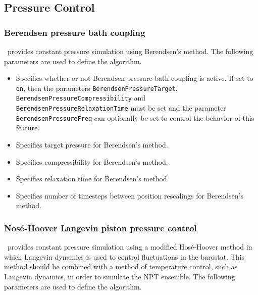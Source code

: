 \subsection{Pressure Control}

\subsubsection{Berendsen pressure bath coupling}

\NAMD\ provides constant pressure simulation using Berendsen's method.  
The following parameters are used to define the algorithm.  

\begin{itemize}

\item
{}
{Specifies whether or not Berendsen pressure bath coupling is active.  
If set to \verb!on!, then the parameters \verb!BerendsenPressureTarget!, \verb!BerendsenPressureCompressibility! and \verb!BerendsenPressureRelaxationTime! must be set 
and the parameter \verb!BerendsenPressureFreq! can
optionally be set to control the behavior of this feature.} 

\item
{}
{Specifies target pressure for Berendsen's method.}

\item
{}
{Specifies compressibility for Berendsen's method.}

\item
{}
{Specifies relaxation time for Berendsen's method.}

\item
{}
{Specifies number of timesteps between position rescalings for Berendsen's method.}

\end{itemize}

\subsubsection{Nos\'{e}-Hoover Langevin piston pressure control}

\NAMD\ provides constant pressure simulation using a modified Hos\'{e}-Hoover method in which Langevin dynamics is used to control fluctuations in the barostat.
This method should be combined with a method of temperature control, such as Langevin dynamics, in order to simulate the NPT ensemble.
The following parameters are used to define the algorithm.  

